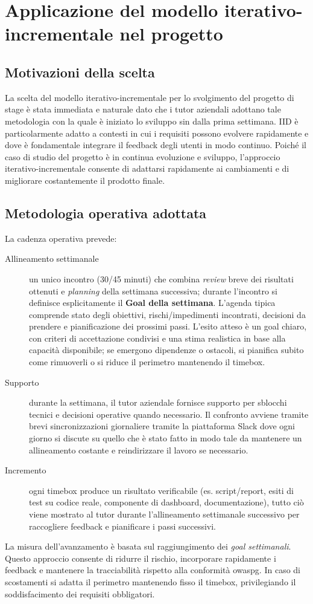 \section{Applicazione del modello iterativo-incrementale nel progetto}
\subsection{Motivazioni della scelta}
La scelta del modello iterativo-incrementale per lo svolgimento del progetto di stage è stata immediata e naturale dato che i tutor aziendali adottano tale metodologia con la quale è iniziato lo sviluppo sin dalla prima settimana. IID è particolarmente adatto a contesti in cui i requisiti possono evolvere rapidamente e dove è fondamentale integrare il feedback degli utenti in modo continuo. Poiché il caso di studio del progetto è in continua evoluzione e sviluppo, l'approccio iterativo-incrementale consente di adattarsi rapidamente ai cambiamenti e di migliorare costantemente il prodotto finale.

\subsection{Metodologia operativa adottata}

La cadenza operativa prevede:
\begin{description}
    \item[Allineamento settimanale] un unico incontro (30/45 minuti) che combina \emph{review} breve dei risultati ottenuti e \emph{planning} della settimana successiva; durante l'incontro si definisce esplicitamente il \textbf{Goal della settimana}. L'agenda tipica comprende stato degli obiettivi, rischi/impedimenti incontrati, decisioni da prendere e pianificazione dei prossimi passi. L'esito atteso è un goal chiaro, con criteri di accettazione condivisi e una stima realistica in base alla capacità disponibile; se emergono dipendenze o ostacoli, si pianifica subito come rimuoverli o si riduce il perimetro mantenendo il timebox.
    \item[Supporto] durante la settimana, il tutor aziendale fornisce supporto per sblocchi tecnici e decisioni operative quando necessario. Il confronto avviene tramite brevi sincronizzazioni giornaliere tramite la piattaforma Slack dove ogni giorno si discute su quello che è stato fatto in modo tale da mantenere un allineamento costante e reindirizzare il lavoro se necessario.
    \item[Incremento] ogni timebox produce un risultato verificabile (es. script/report, esiti di test su codice reale, componente di dashboard, documentazione), tutto ciò viene mostrato al tutor durante l'allineamento settimanale successivo per raccogliere feedback e pianificare i passi successivi.
\end{description}

La misura dell'avanzamento è basata sul raggiungimento dei \emph{goal settimanali}. Questo approccio consente di ridurre il rischio, incorporare rapidamente i feedback e mantenere la tracciabilità rispetto alla conformità \gls{owaspg}. 
In caso di scostamenti si adatta il perimetro mantenendo fisso il timebox, privilegiando il soddisfacimento dei requisiti obbligatori. 
